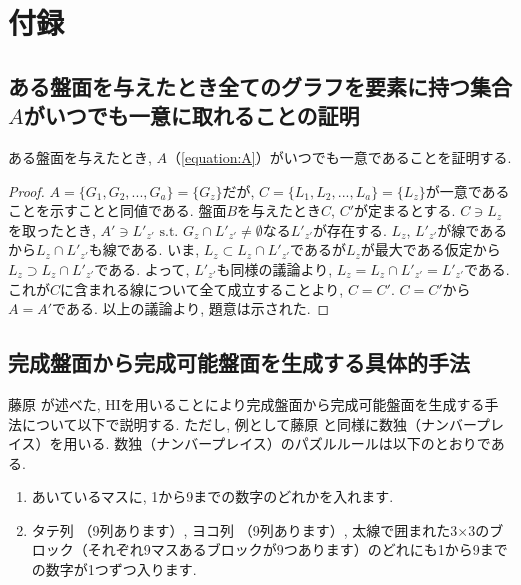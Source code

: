 \chapter{付録}
\section{ある盤面を与えたとき全てのグラフを要素に持つ集合$A$がいつでも一意に取れることの証明}\label{section:GraphUnique}
ある盤面を与えたとき, $A$（\cref{equation:A}）がいつでも一意であることを証明する.
\begin{proof}
  $A=\{G_1,G_2,...,G_a\}=\{G_z\}$だが, $C=\{L_1,L_2,...,L_a\}=\{L_z\}$が一意であることを示すことと同値である. 盤面$B$を与えたとき$C$, $C'$が定まるとする. $C\ni  L_z$を取ったとき, $A'\ni  L'_{z'} \mbox{ s.t. $G_z \cap L'_{z'} \neq \emptyset $}$なる$L'_{z'}$が存在する. $L_z$, $L'_{z'}$が線であるから$L_z\cap L'_{z'}$も線である. いま, $L_z\subset L_z\cap L'_{z'}$であるが$L_z$が最大である仮定から$L_z\supset L_z\cap L'_{z'}$である. よって, $L'_{z'}$も同様の議論より, $L_z= L_z\cap L'_{z'}=L'_{z'}$である. これが$C$に含まれる線について全て成立することより, $C=C'$. $C=C'$から$A=A'$である. 以上の議論より, 題意は示された.
\end{proof}

\section{完成盤面から完成可能盤面を生成する具体的手法}\label{section:GenericAlgorithm}
藤原 \cite{Fujiwara2022}が述べた, HIを用いることにより完成盤面から完成可能盤面を生成する手法について以下で説明する. ただし, 例として藤原 \cite{Fujiwara2022}と同様に数独（ナンバープレイス）を用いる. 数独（ナンバープレイス）のパズルルールは以下のとおりである. \cite{web:Sudoku}

\begin{enumerate}
  \item あいているマスに, 1から9までの数字のどれかを入れます.
  \item タテ列 （9列あります）, ヨコ列 （9列あります）, 太線で囲まれた3$\times$3のブロック（それぞれ9マスあるブロックが9つあります）のどれにも1から9までの数字が1つずつ入ります.
\end{enumerate}

